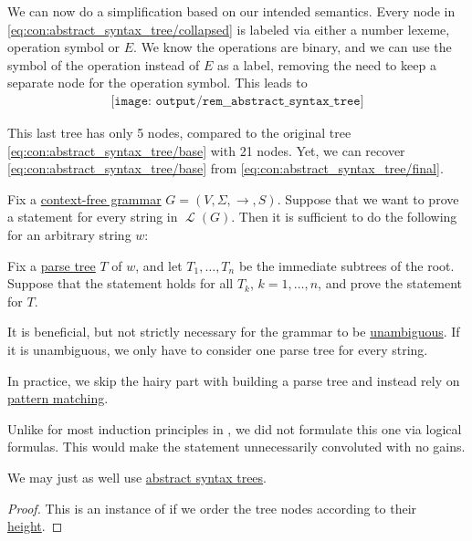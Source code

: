 \begin{concept}
  We can now do a simplification based on our intended semantics. Every node in \eqref{eq:con:abstract_syntax_tree/collapsed} is labeled via either a number lexeme, operation symbol or \( E \). We know the operations are binary, and we can use the symbol of the operation instead of \( E \) as a label, removing the need to keep a separate node for the operation symbol. This leads to
  \begin{equation}\label{eq:con:abstract_syntax_tree/final}
    \begin{aligned}
      \texttt{[image: output/rem\_\_abstract\_syntax\_tree]}
    \end{aligned}
  \end{equation}

  This last tree has only 5 nodes, compared to the original tree \eqref{eq:con:abstract_syntax_tree/base} with 21 nodes. Yet, we can recover \eqref{eq:con:abstract_syntax_tree/base} from \eqref{eq:con:abstract_syntax_tree/final}.
\end{concept}

\begin{theorem}\label{thm:induction_on_syntax_trees}\mimprovised
  Fix a \hyperref[def:chomsky_hierarchy/context_free]{context-free grammar} \( G = (V, \Sigma, \to, S) \). Suppose that we want to prove a statement for every string in \( \mscrL(G) \). Then it is sufficient to do the following for an arbitrary string \( w \):
  \begin{displayquote}
    Fix a \hyperref[def:parse_tree]{parse tree} \( T \) of \( w \), and let \( T_1, \ldots, T_n \) be the immediate subtrees of the root. Suppose that the statement holds for all \( T_k \), \( k = 1, \ldots, n \), and prove the statement for \( T \).
  \end{displayquote}
\end{theorem}
\begin{comments}
  \item It is beneficial, but not strictly necessary for the grammar to be \hyperref[def:grammar_ambiguity]{unambiguous}. If it is unambiguous, we only have to consider one parse tree for every string.
  \item In practice, we skip the hairy part with building a parse tree and instead rely on \hyperref[con:evaluation]{pattern matching}.
  \item Unlike for most induction principles in , we did not formulate this one via logical formulas. This would make the statement unnecessarily convoluted with no gains.
  \item We may just as well use \hyperref[con:abstract_syntax_tree]{abstract syntax trees}.
\end{comments}
\begin{proof}
  This is an instance of  if we order the tree nodes according to their \hyperref[def:rooted_tree/height]{height}.
\end{proof}

